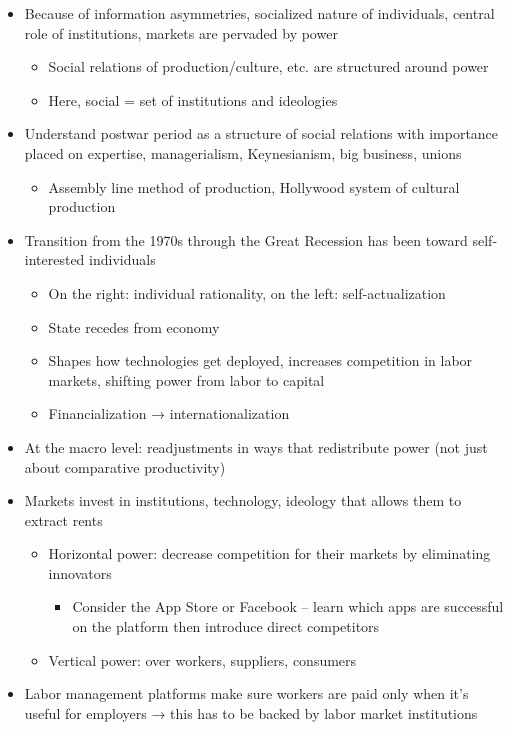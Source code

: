 \begin{itemize}
\tightlist
\item
  Because of information asymmetries, socialized nature of individuals,
  central role of institutions, markets are pervaded by power

  \begin{itemize}
  \tightlist
  \item
    Social relations of production/culture, etc. are structured around
    power
  \item
    Here, social = set of institutions and ideologies
  \end{itemize}
\item
  Understand postwar period as a structure of social relations with
  importance placed on expertise, managerialism, Keynesianism, big
  business, unions

  \begin{itemize}
  \tightlist
  \item
    Assembly line method of production, Hollywood system of cultural
    production
  \end{itemize}
\item
  Transition from the 1970s through the Great Recession has been toward
  self-interested individuals

  \begin{itemize}
  \tightlist
  \item
    On the right: individual rationality, on the left:
    self-actualization
  \item
    State recedes from economy
  \item
    Shapes how technologies get deployed, increases competition in labor
    markets, shifting power from labor to capital
  \item
    Financialization → internationalization
  \end{itemize}
\item
  At the macro level: readjustments in ways that redistribute power (not
  just about comparative productivity)
\item
  Markets invest in institutions, technology, ideology that allows them
  to extract rents

  \begin{itemize}
  \tightlist
  \item
    Horizontal power: decrease competition for their markets by
    eliminating innovators

    \begin{itemize}
    \tightlist
    \item
      Consider the App Store or Facebook -- learn which apps are
      successful on the platform then introduce direct competitors
    \end{itemize}
  \item
    Vertical power: over workers, suppliers, consumers
  \end{itemize}
\item
  Labor management platforms make sure workers are paid only when it's
  useful for employers → this has to be backed by labor market
  institutions


\end{itemize}
